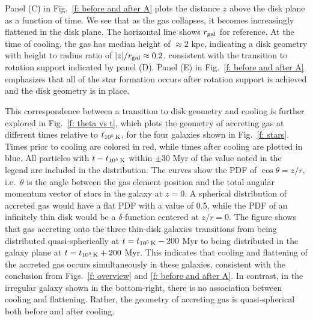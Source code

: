 \documentclass[fleqn,usenatbib]{mnras}
\newcommand{\tcools}{t_{10^5\,{\rm K}}}
\begin{document}
Panel (C) in Fig.~\ref{f: before and after A} plots the distance $z$ above the disk plane as a function of time.
We see that as the gas collapses, it becomes increasingly flattened in the disk plane.
The horizontal line shows $r_{\rm gal}$ for reference.
At the time of cooling, the gas has median height of $\approx 2$ kpc, indicating a disk geometry with height to radius ratio of $\vert z\vert/r_{\rm gal}\approx0.2$, consistent with the transition to rotation support indicated by panel (D).
Panel (E) in Fig.~\ref{f: before and after A} emphasizes that all of the star formation occurs after rotation support is achieved and the disk geometry is in place.

This correspondence between a transition to disk geometry and cooling is further explored in Fig.~\ref{f: theta vs t}, which plots the geometry of accreting gas at different times relative to $\tcools$, for the four galaxies shown in Fig.~\ref{f: stars}. 
Times prior to cooling are colored in red, while times after cooling are plotted in blue.
All particles with $t-\tcools$ within $\pm$30 Myr of the value noted in the legend are included in the distribution. 
The curves show the PDF of $\cos \theta = z/r$, i.e.\ $\theta$ is the angle between the gas element position and the total angular momentum vector of stars in the galaxy at $z=0$.
A spherical distribution of accreted gas would have a flat PDF with a value of 0.5, while 
the PDF of an infinitely thin disk would be a $\delta$-function centered at $z/r = 0$.
The figure shows that gas accreting onto the three thin-disk galaxies transitions from being distributed quasi-spherically at $t = \tcools-200$ Myr to being distributed in the galaxy plane at $t = \tcools+200$ Myr.
This indicates that cooling and flattening of the accreted gas occurs simultaneously in these galaxies, consistent with the conclusion from Figs.~\ref{f: overview} and \ref{f: before and after A}.
In contrast, in the irregular galaxy shown in the bottom-right, there is no association between cooling and flattening.
Rather, the geometry of accreting gas is quasi-spherical both before and after cooling.
\end{document}
